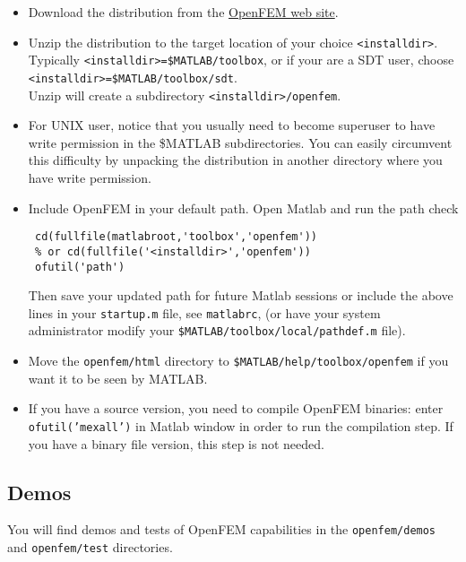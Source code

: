 \begin{itemize}

\item Download the distribution from the \href{http://www-rocq.inria.fr/OpenFEM}{OpenFEM web site}.

\item Unzip the distribution to the target location of your choice {\tt <installdir>}. 
Typically {\tt <installdir>=\$MATLAB/toolbox}, or if your are a SDT user, choose
{\tt <installdir>=\$MATLAB/toolbox/sdt}.\\
Unzip will create a subdirectory {\tt <installdir>/openfem}.

\item For UNIX user, notice that you usually need to become superuser
to have write permission in the \$MATLAB subdirectories. You can easily circumvent this difficulty by
unpacking the distribution in another directory where you have write permission.

\item Include OpenFEM in your default path. Open Matlab and run the path check

\begin{verbatim}
 cd(fullfile(matlabroot,'toolbox','openfem'))
 % or cd(fullfile('<installdir>','openfem'))
 ofutil('path')
\end{verbatim}

Then save your updated path for future Matlab sessions or include the above lines in your {\tt startup.m} file, 
see {\tt matlabrc}, (or have your system administrator modify your {\tt \$MATLAB/toolbox/local/pathdef.m} 
file).

\item Move the {\tt openfem/html} directory to {\tt \$MATLAB/help/toolbox/openfem} if you want it to be seen by MATLAB.

\item If you have a source version, you need to compile OpenFEM binaries: enter {\tt ofutil('mexall')} in Matlab window in order to run the compilation step. If you have a binary file version, this step is not needed.

\end{itemize}

\subsection{Demos}

You will find demos and tests of OpenFEM capabilities in the {\tt openfem/demos} and {\tt openfem/test} directories.

